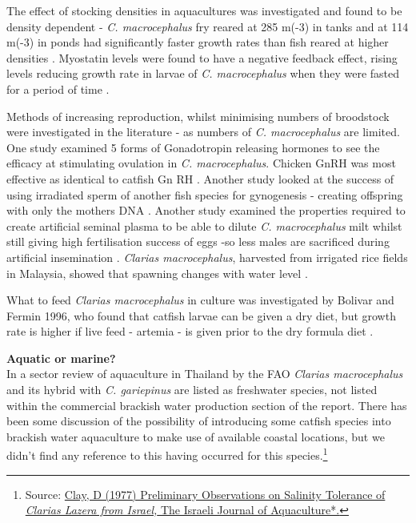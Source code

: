 \documentclass[openany]{book}
\let\rmarkdownfootnote\footnote%
\def\footnote{\protect\rmarkdownfootnote}
\theoremstyle{definition}
\theoremstyle{definition}
\theoremstyle{definition}
\theoremstyle{remark}
\begin{document}
The effect of stocking densities in aquacultures was investigated and
found to be density dependent - \emph{C. macrocephalus} fry reared at
285 m(-3) in tanks and at 114 m(-3) in ponds had significantly faster
growth rates than fish reared at higher densities \citep{Bombeo_2002}.
Myostatin levels were found to have a negative feedback effect, rising
levels reducing growth rate in larvae of \emph{C. macrocephalus} when
they were fasted for a period of time \citep{Kanjanaworakul_2014}.

Methods of increasing reproduction, whilst minimising numbers of
broodstock were investigated in the literature - as numbers of \emph{C.
macrocephalus} are limited. One study examined 5 forms of Gonadotropin
releasing hormones to see the efficacy at stimulating ovulation in
\emph{C. macrocephalus}. Chicken GnRH was most effective as identical to
catfish Gn RH \citep{Ngamvongchon_1992}. Another study looked at the
success of using irradiated sperm of another fish species for
gynogenesis - creating offspring with only the mothers DNA
\citep{Na_Nakorn_2004}. Another study examined the properties required
to create artificial seminal plasma to be able to dilute \emph{C.
macrocephalus} milt whilst still giving high fertilisation success of
eggs -so less males are sacrificed during artificial insemination
\citep{Tan_Fermin_1999}. \emph{Clarias macrocephalus}, harvested from
irrigated rice fields in Malaysia, showed that spawning changes with
water level \citep{Ali_1993}.

What to feed \emph{Clarias macrocephalus} in culture was investigated by
Bolivar and Fermin 1996, who found that catfish larvae can be given a
dry diet, but growth rate is higher if live feed - artemia - is given
prior to the dry formula diet \citep{Fermin_1996}.

\textbf{Aquatic or marine?}\\
In a sector review of aquaculture in Thailand by the FAO \emph{Clarias
macrocephalus} and its hybrid with \emph{C. gariepinus} are listed as
freshwater species, not listed within the commercial brackish water
production section of the report. There has been some discussion of the
possibility of introducing some catfish species into brackish water
aquaculture to make use of available coastal locations, but we didn't
find any reference to this having occurred for this species.\footnote{Source:
  \href{https://www.researchgate.net/profile/Douglas_Clay/publication/313167412_Preliminary_observations_on_salinity_tolerance_of_Clarias_lazera_from_Israel/links/58d73761aca2727e5ee94ab6/Preliminary-observations-on-salinity-tolerance-of-Clarias-lazera-from-Israel.pdf}{Clay,
  D (1977) Preliminary Observations on Salinity Tolerance of
  \emph{Clarias Lazera from Israel, }The Israeli Journal of
  Aquaculture*.}}
\end{document}

